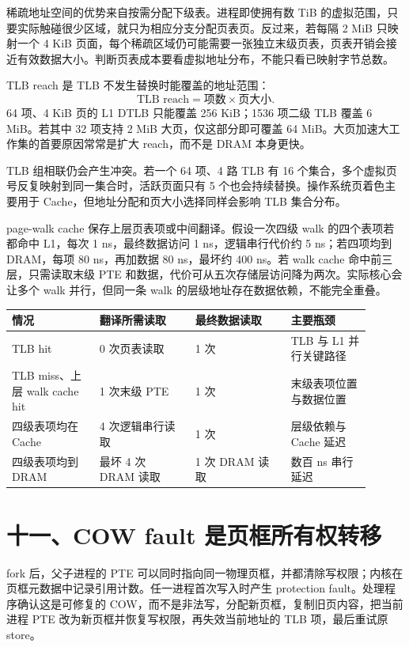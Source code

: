 稀疏地址空间的优势来自按需分配下级表。进程即使拥有数 TiB 的虚拟范围，只要实际触碰很少区域，就只为相应分支分配页表页。反过来，若每隔 2 MiB 只映射一个 4 KiB 页面，每个稀疏区域仍可能需要一张独立末级页表，页表开销会接近有效数据大小。判断页表成本要看虚拟地址分布，不能只看已映射字节总数。


TLB reach 是 TLB 不发生替换时能覆盖的地址范围：
\[
\text{TLB reach}=\text{项数}\times\text{页大小}.
\]
64 项、4 KiB 页的 L1 DTLB 只能覆盖 256 KiB；1536 项二级 TLB 覆盖 6 MiB。若其中 32 项支持 2 MiB 大页，仅这部分即可覆盖 64 MiB。大页加速大工作集的首要原因常常是扩大 reach，而不是 DRAM 本身更快。

TLB 组相联仍会产生冲突。若一个 64 项、4 路 TLB 有 16 个集合，多个虚拟页号反复映射到同一集合时，活跃页面只有 5 个也会持续替换。操作系统页着色主要用于 Cache，但地址分配和页大小选择同样会影响 TLB 集合分布。

page-walk cache 保存上层页表项或中间翻译。假设一次四级 walk 的四个表项若都命中 L1，每次 1 ns，最终数据访问 1 ns，逻辑串行代价约 5 ns；若四项均到 DRAM，每项 80 ns，再加数据 80 ns，最坏约 400 ns。若 walk cache 命中前三层，只需读取末级 PTE 和数据，代价可从五次存储层访问降为两次。实际核心会让多个 walk 并行，但同一条 walk 的层级地址存在数据依赖，不能完全重叠。

\begin{longtable}{L{0.22\linewidth}L{0.24\linewidth}L{0.24\linewidth}L{0.20\linewidth}}
\toprule
情况 & 翻译所需读取 & 最终数据读取 & 主要瓶颈 \\
\midrule
TLB hit & 0 次页表读取 & 1 次 & TLB 与 L1 并行关键路径 \\\tablerowrule
TLB miss、上层 walk cache hit & 1 次末级 PTE & 1 次 & 末级表项位置与数据位置 \\\tablerowrule
四级表项均在 Cache & 4 次逻辑串行读取 & 1 次 & 层级依赖与 Cache 延迟 \\\tablerowrule
四级表项均到 DRAM & 最坏 4 次 DRAM 读取 & 1 次 DRAM 读取 & 数百 ns 串行延迟 \\
\bottomrule
\end{longtable}

\section{十一、COW fault 是页框所有权转移}

fork 后，父子进程的 PTE 可以同时指向同一物理页框，并都清除写权限；内核在页框元数据中记录引用计数。任一进程首次写入时产生 protection fault。处理程序确认这是可修复的 COW，而不是非法写，分配新页框，复制旧页内容，把当前进程 PTE 改为新页框并恢复写权限，再失效当前地址的 TLB 项，最后重试原 store。


